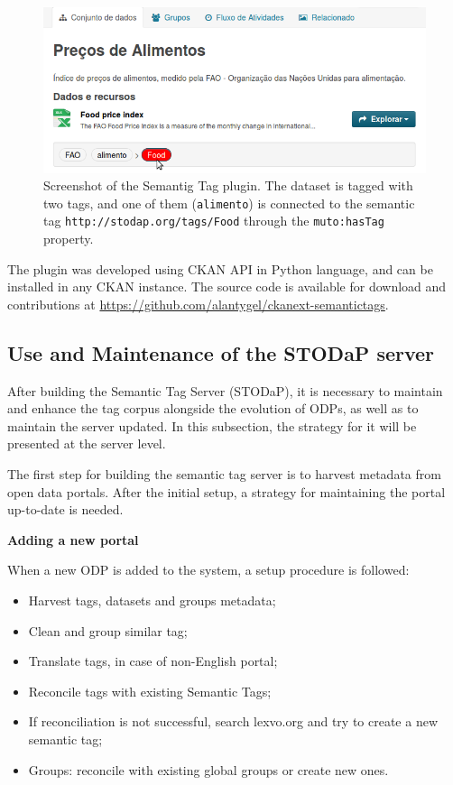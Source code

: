 \begin{figure}[ht]
\begin{center}
\includegraphics[width=\columnwidth]{images/local_link.png}
\caption[Screenshot of the Semantig Tag plugin.]{Screenshot of the Semantig Tag plugin. The dataset is tagged with two tags, and one of them (\texttt{alimento}) is connected to the semantic tag \texttt{http://stodap.org/tags/Food} through the \texttt{muto:hasTag} property.}
\label{fig:local_link}
\end{center}
\end{figure}

The plugin was developed using CKAN API in Python language, and can be installed in any CKAN instance. The source code is available for download and contributions at \url{https://github.com/alantygel/ckanext-semantictags}.

\subsection{Use and Maintenance of the STODaP server}
\label{sec:use_and_maintenance}

After building the Semantic Tag Server (STODaP), it is necessary to maintain and enhance the tag corpus alongside the evolution of ODPs, as well as to maintain the server updated.
In this subsection, the strategy for it will be presented at the server level.

The first step for building the semantic tag server is to harvest metadata from open data portals.
After the initial setup, a strategy for maintaining the portal up-to-date is needed.

\textbf{Adding a new portal}

When a new ODP is added to the system, a setup procedure is followed:
\begin{itemize}
	\item Harvest tags, datasets and groups metadata;
	\item Clean and group similar tag;
	\item Translate tags, in case of non-English portal;
	\item Reconcile tags with existing Semantic Tags;
	\item If reconciliation is not successful, search lexvo.org and try to create a new semantic tag;
	\item Groups: reconcile with existing global groups or create new ones.
\end{itemize}

